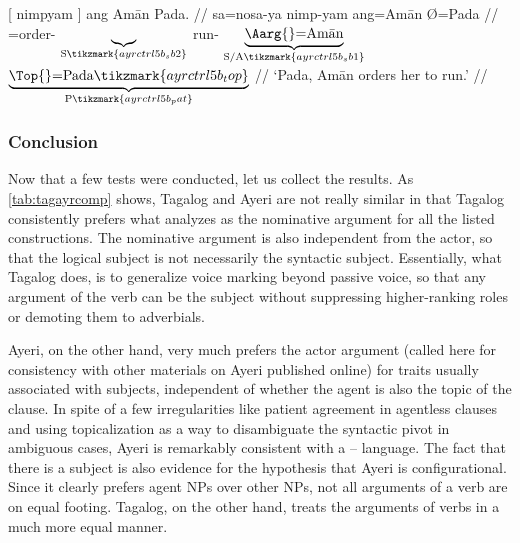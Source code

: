 \a\label{ex:ayrctrl5_2}%
\begingl[aboveglcskip=1.5em, aboveglftskip=1.75em] %
	 \textup{[} {} nimpyam \textup{]} {ang Amān} 
		Pada. //
	\glb sa=nosa-ya {} {} nimp-yam {} ang=Amān Ø=Pada //
	\glc \PatT{}=order-\TsgM{}%
		{}
		$\underbrace{}_{\text{S}%
			\tikzmark{ayrctrl5b_sb2}%
		}$
		run-\Ptcp{}
		{}
		$\underbrace{\text{\Aarg{}=Amān}}_{\text{S/A}%
			\tikzmark{ayrctrl5b_sb1}%
		}$
		$\underbrace{\text{\Top{}=Pada}%
			\tikzmark{ayrctrl5b_top}%
		}_{\text{P}%
			\tikzmark{ayrctrl5b_pat}%
		}$
		//
	\glft `Pada, Amān orders her to run.' //
\endgl
{}
\xe

\subsubsection{Conclusion}

Now that a few tests were conducted, let us collect the results. As
\autoref{tab:tagayrcomp} shows, Tagalog and Ayeri are not really similar in
that Tagalog consistently prefers what \citet{kroeger1991} analyzes as the
nominative argument for all the listed constructions. The nominative argument
is also independent from the actor, so that the logical subject is not
necessarily the syntactic subject. Essentially, what Tagalog does, is to
generalize voice marking beyond passive voice, so that any argument of the verb
can be the subject without suppressing higher-ranking roles or demoting them to
adverbials.

Ayeri, on the other hand, very much prefers the actor argument (called
 here for consistency with other materials on Ayeri published online)
for traits usually associated with subjects, independent of whether the agent
is also the topic of the clause. In spite of a few irregularities like patient
agreement in agentless clauses and using topicalization as a way to
disambiguate the syntactic pivot in ambiguous cases, Ayeri is remarkably
consistent with a \Nom{}--\Acc{} language. The fact that there is a subject is
also evidence for the hypothesis that Ayeri is configurational. Since it
clearly prefers agent NPs over other NPs, not all arguments of a verb are on
equal footing. Tagalog, on the other hand, treats the arguments of verbs in a
much more equal manner.

